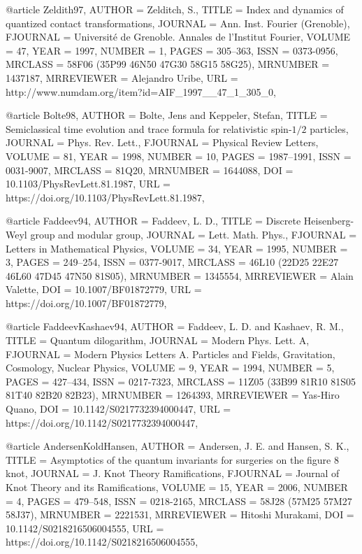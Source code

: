 @article {Zeldith97,
    AUTHOR = {Zelditch, S.},
     TITLE = {Index and dynamics of quantized contact transformations},
   JOURNAL = {Ann. Inst. Fourier (Grenoble)},
  FJOURNAL = {Universit\'{e} de Grenoble. Annales de l'Institut Fourier},
    VOLUME = {47},
      YEAR = {1997},
    NUMBER = {1},
     PAGES = {305--363},
      ISSN = {0373-0956},
   MRCLASS = {58F06 (35P99 46N50 47G30 58G15 58G25)},
  MRNUMBER = {1437187},
MRREVIEWER = {Alejandro Uribe},
       URL = {http://www.numdam.org/item?id=AIF_1997__47_1_305_0},
}

@article {Bolte98,
    AUTHOR = {Bolte, Jens and Keppeler, Stefan},
     TITLE = {Semiclassical time evolution and trace formula for
              relativistic spin-{$1/2$} particles},
   JOURNAL = {Phys. Rev. Lett.},
  FJOURNAL = {Physical Review Letters},
    VOLUME = {81},
      YEAR = {1998},
    NUMBER = {10},
     PAGES = {1987--1991},
      ISSN = {0031-9007},
   MRCLASS = {81Q20},
  MRNUMBER = {1644088},
       DOI = {10.1103/PhysRevLett.81.1987},
       URL = {https://doi.org/10.1103/PhysRevLett.81.1987},
}

@article {Faddeev94,
    AUTHOR = {Faddeev, L. D.},
     TITLE = {Discrete {H}eisenberg-{W}eyl group and modular group},
   JOURNAL = {Lett. Math. Phys.},
  FJOURNAL = {Letters in Mathematical Physics},
    VOLUME = {34},
      YEAR = {1995},
    NUMBER = {3},
     PAGES = {249--254},
      ISSN = {0377-9017},
   MRCLASS = {46L10 (22D25 22E27 46L60 47D45 47N50 81S05)},
  MRNUMBER = {1345554},
MRREVIEWER = {Alain Valette},
       DOI = {10.1007/BF01872779},
       URL = {https://doi.org/10.1007/BF01872779},
}

@article {FaddeevKashaev94,
    AUTHOR = {Faddeev, L. D. and Kashaev, R. M.},
     TITLE = {Quantum dilogarithm},
   JOURNAL = {Modern Phys. Lett. A},
  FJOURNAL = {Modern Physics Letters A. Particles and Fields, Gravitation,
              Cosmology, Nuclear Physics},
    VOLUME = {9},
      YEAR = {1994},
    NUMBER = {5},
     PAGES = {427--434},
      ISSN = {0217-7323},
   MRCLASS = {11Z05 (33B99 81R10 81S05 81T40 82B20 82B23)},
  MRNUMBER = {1264393},
MRREVIEWER = {Yas-Hiro Quano},
       DOI = {10.1142/S0217732394000447},
       URL = {https://doi.org/10.1142/S0217732394000447},
}

@article {AndersenKoldHansen,
    AUTHOR = {Andersen, J. E. and Hansen, S. K.},
     TITLE = {Asymptotics of the quantum invariants for surgeries on the
              figure 8 knot},
   JOURNAL = {J. Knot Theory Ramifications},
  FJOURNAL = {Journal of Knot Theory and its Ramifications},
    VOLUME = {15},
      YEAR = {2006},
    NUMBER = {4},
     PAGES = {479--548},
      ISSN = {0218-2165},
   MRCLASS = {58J28 (57M25 57M27 58J37)},
  MRNUMBER = {2221531},
MRREVIEWER = {Hitoshi Murakami},
       DOI = {10.1142/S0218216506004555},
       URL = {https://doi.org/10.1142/S0218216506004555},
}

